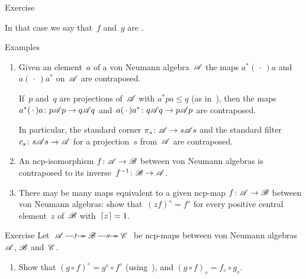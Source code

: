 \documentclass[a]{subfiles}
\begin{document}
\begin{parsec}
\begin{point}{Exercise}
\begin{point}
In that case we say that~$f$ and~$g$ are .
\end{point}
\end{point}
\begin{point}{Examples}%
\begin{enumerate}
\item
Given an element~$a$ of a von Neumann algebra~$\mathscr{A}$
the maps $a^*(\,\cdot\,)a$ and~$a(\,\cdot\,)a^*$
on~$\mathscr{A}$ are contraposed.

If~$p$ and~$q$ are projections of~$\mathscr{A}$
with $a^*pa\leq q$
(as in~),
then the maps
$a^*(\,\cdot\,)a \colon p\mathscr{A} p\to q\mathscr{A} q$
and~$a(\,\cdot\,)a^*\colon q\mathscr{A} q \to p\mathscr{A} p$
are contraposed.

In particular,
the standard corner $\pi_s\colon \mathscr{A}\to s \mathscr{A} s$
and the standard filter $c_s\colon s\mathscr{A} s\to \mathscr{A}$
for a projection~$s$ from~$\mathscr{A}$
are contraposed.
\item
An ncp-isomorphism $f\colon \mathscr{A}\to\mathscr{B}$
between von Neumann algebras
is contraposed to its inverse~$f^{-1}\colon \mathscr{B}\to\mathscr{A}$.
\item
There may be many maps equivalent to a given ncp-map $f\colon \mathscr{A}\to\mathscr{B}$
between von Neumann algebras:
show that~$(zf)^\diamond = f^\diamond$
for every positive central element~$z$ of~$\mathscr{B}$ with~$\left\lceil z\right\rceil=1$.
\end{enumerate}
\end{point}
\begin{point}{Exercise}%
Let $\xymatrix{
	\scrA\ar[r]|-{f}&
	\scrB\ar[r]|-{g}&
\scrC}$
be ncp-maps between von Neumann algebras~$\mathscr{A}$,
$\mathscr{B}$ and~$\mathscr{C}$.
\begin{enumerate}
\item
Show that $(g\circ f)^\diamond = g^\diamond\circ f^\diamond$
(using~),
and $(g\circ f)_\diamond = f_\diamond\circ g_\diamond$.


\end{enumerate}
\end{point}
\end{parsec}
\end{document}
